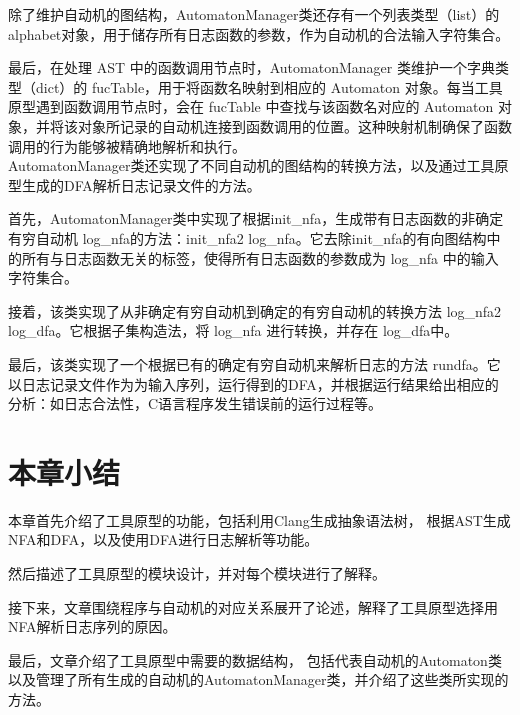 除了维护自动机的图结构，AutomatonManager类还存有一个列表类型（list）的alphabet对象，用于储存所有日志函数的参数，作为自动机的合法输入字符集合。

最后，在处理 AST 中的函数调用节点时，AutomatonManager 类维护一个字典类型（dict）的 fucTable，用于将函数名映射到相应的 Automaton 对象。每当工具原型遇到函数调用节点时，会在 fucTable 中查找与该函数名对应的 Automaton 对象，并将该对象所记录的自动机连接到函数调用的位置。这种映射机制确保了函数调用的行为能够被精确地解析和执行。\\

AutomatonManager类还实现了不同自动机的图结构的转换方法，以及通过工具原型生成的DFA解析日志记录文件的方法。

首先，AutomatonManager类中实现了根据init\_nfa，生成带有日志函数的非确定有穷自动机  log\_nfa的方法：init\_nfa2 log\_nfa。它去除init\_nfa的有向图结构中的所有与日志函数无关的标签，使得所有日志函数的参数成为  log\_nfa 中的输入字符集合。

接着，该类实现了从非确定有穷自动机到确定的有穷自动机的转换方法  log\_nfa2 log\_dfa。它根据子集构造法，将  log\_nfa 进行转换，并存在 log\_dfa中。

最后，该类实现了一个根据已有的确定有穷自动机来解析日志的方法 rundfa。它以日志记录文件作为为输入序列，运行得到的DFA，并根据运行结果给出相应的分析：如日志合法性，C语言程序发生错误前的运行过程等。
\section{本章小结}
本章首先介绍了工具原型的功能，包括利用Clang生成抽象语法树，
根据AST生成NFA和DFA，以及使用DFA进行日志解析等功能。

然后描述了工具原型的模块设计，并对每个模块进行了解释。

接下来，文章围绕程序与自动机的对应关系展开了论述，解释了工具原型选择用NFA解析日志序列的原因。

最后，文章介绍了工具原型中需要的数据结构，
包括代表自动机的Automaton类以及管理了所有生成的自动机的AutomatonManager类，并介绍了这些类所实现的方法。



